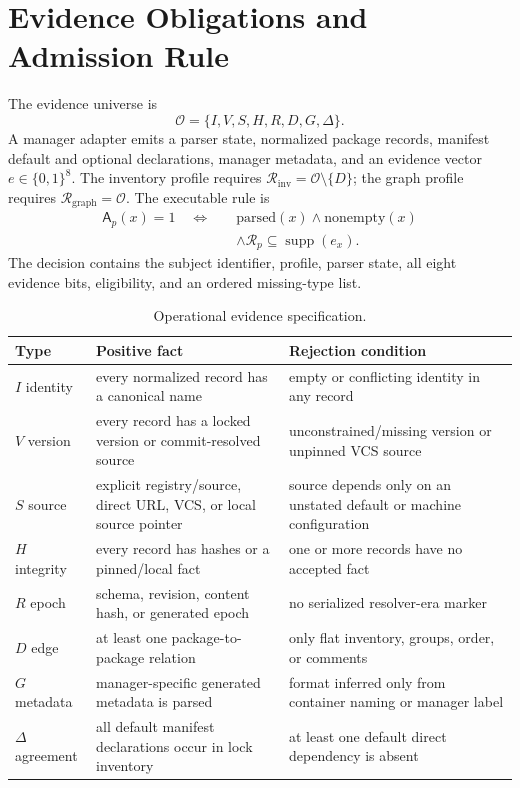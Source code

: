 \documentclass[10pt,conference]{IEEEtran}
\newcommand{\Oblig}{\mathcal{O}}
\newcommand{\Req}{\mathcal{R}}
\newcommand{\supp}{\operatorname{supp}}
\newcommand{\admit}{\mathsf{A}}
\begin{document}
\section{Evidence Obligations and Admission Rule}
The evidence universe is
\[
\Oblig=\{I,V,S,H,R,D,G,\Delta\}.
\]
A manager adapter emits a parser state, normalized package records, manifest default and optional declarations, manager metadata, and an evidence vector $e\in\{0,1\}^8$. The inventory profile requires $\Req_{\mathrm{inv}}=\Oblig\setminus\{D\}$; the graph profile requires $\Req_{\mathrm{graph}}=\Oblig$. The executable rule is
\[
\begin{aligned}
\admit_p(x)=1\quad\Longleftrightarrow\quad &\mathrm{parsed}(x)\land\mathrm{nonempty}(x)\\
&\land\Req_p\subseteq\supp(e_x).
\end{aligned}
\]
The decision contains the subject identifier, profile, parser state, all eight evidence bits, eligibility, and an ordered missing-type list.

\begin{table}[t]
\caption{Operational evidence specification.}
\centering\small
\begin{tabularx}{\textwidth}{p{}X X}
\toprule
Type & Positive fact & Rejection condition\\
\midrule
$I$ identity & every normalized record has a canonical name & empty or conflicting identity in any record\\
$V$ version & every record has a locked version or commit-resolved source & unconstrained/missing version or unpinned VCS source\\
$S$ source & explicit registry/source, direct URL, VCS, or local source pointer & source depends only on an unstated default or machine configuration\\
$H$ integrity & every record has hashes or a pinned/local fact & one or more records have no accepted fact\\
$R$ epoch & schema, revision, content hash, or generated epoch & no serialized resolver-era marker\\
$D$ edge & at least one package-to-package relation & only flat inventory, groups, order, or comments\\
$G$ metadata & manager-specific generated metadata is parsed & format inferred only from container naming or manager label\\
$\Delta$ agreement & all default manifest declarations occur in lock inventory & at least one default direct dependency is absent\\
\bottomrule
\end{tabularx}
\end{table}
\end{document}
